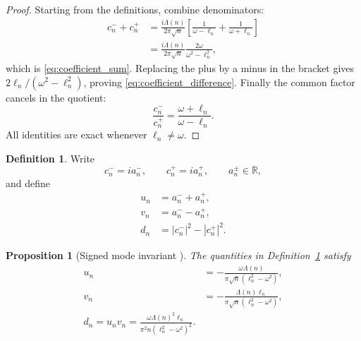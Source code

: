 \documentclass[11pt]{amsart}
\numberwithin{equation}{section}
\theoremstyle{plain}
\newtheorem{proposition}[theorem]{Proposition}
\theoremstyle{definition}
\newtheorem{definition}[theorem]{Definition}
\theoremstyle{remark}
\newcommand{\1}{\mathbf{1}}
\begin{document}
\begin{proof}
Starting from the definitions, combine denominators:
\begin{align}
c_n^-+c_n^+
&=
\frac{i\Lambda(n)}{2\pi\sqrt n}
\left[
\frac1{\omega-\ell_n}+\frac1{\omega+\ell_n}
\right]
\label{eq:coefficient_sum_proof_one}
\\
&=
\frac{i\Lambda(n)}{2\pi\sqrt n}
\frac{2\omega}{\omega^2-\ell_n^2},
\label{eq:coefficient_sum_proof_two}
\end{align}
which is \eqref{eq:coefficient_sum}.  Replacing the plus by a minus in
the bracket gives \(2\ell_n/(\omega^2-\ell_n^2)\), proving
\eqref{eq:coefficient_difference}.  Finally the common factor cancels in
the quotient:
\begin{equation}
\frac{c_n^-}{c_n^+}
=
\frac{\omega+\ell_n}{\omega-\ell_n}.
\label{eq:coefficient_ratio_proof}
\end{equation}
All identities are exact whenever \(\ell_n\neq\omega\).
\end{proof}

\begin{definition}
\label{def:u_v_d}
Write
\begin{equation}
c_n^-=ia_n^-,
\qquad
c_n^+=ia_n^+,
\qquad
a_n^\pm\in\mathbb R,
\label{eq:a_pm_definition}
\end{equation}
and define
\begin{align}
u_n
&=
a_n^-+a_n^+,
\label{eq:un_definition}
\\
v_n
&=
a_n^--a_n^+,
\label{eq:vn_definition}
\\
d_n
&=
|c_n^-|^2-|c_n^+|^2.
\label{eq:dn_definition}
\end{align}
\end{definition}


\begin{proposition}[Signed mode invariant {}]
\label{prop:signed_mode_invariant}
The quantities in Definition~\ref{def:u_v_d} satisfy
\begin{align}
u_n
&=
-\frac{\omega\Lambda(n)}
{\pi\sqrt n(\ell_n^2-\omega^2)},
\label{eq:un_formula}
\\
v_n
&=
-\frac{\Lambda(n)\ell_n}
{\pi\sqrt n(\ell_n^2-\omega^2)},
\label{eq:vn_formula}
\\
\boxed{
d_n=u_nv_n
=
\frac{\omega\Lambda(n)^2\ell_n}
{\pi^2n(\ell_n^2-\omega^2)^2}.
}
\label{eq:dn_formula}
\end{align}
\end{proposition}
\end{document}
